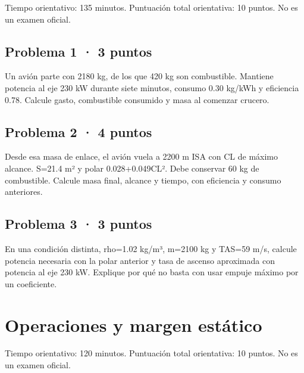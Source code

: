 Tiempo orientativo: 135 minutos. Puntuación total orientativa: 10 puntos. No es un examen oficial.

\section{Problema 1 · 3 puntos}

Un avión parte con 2180 kg, de los que 420 kg son combustible. Mantiene potencia al eje 230 kW durante siete minutos, consumo 0.30 kg/kWh y eficiencia 0.78. Calcule gasto, combustible consumido y masa al comenzar crucero.


\section{Problema 2 · 4 puntos}

Desde esa masa de enlace, el avión vuela a 2200 m ISA con CL de máximo alcance. S=21.4 m² y polar 0.028+0.049CL². Debe conservar 60 kg de combustible. Calcule masa final, alcance y tiempo, con eficiencia y consumo anteriores.


\section{Problema 3 · 3 puntos}

En una condición distinta, rho=1.02 kg/m³, m=2100 kg y TAS=59 m/s, calcule potencia necesaria con la polar anterior y tasa de ascenso aproximada con potencia al eje 230 kW. Explique por qué no basta con usar empuje máximo por un coeficiente.


\chapter{Operaciones y margen estático}

Tiempo orientativo: 120 minutos. Puntuación total orientativa: 10 puntos. No es un examen oficial.

